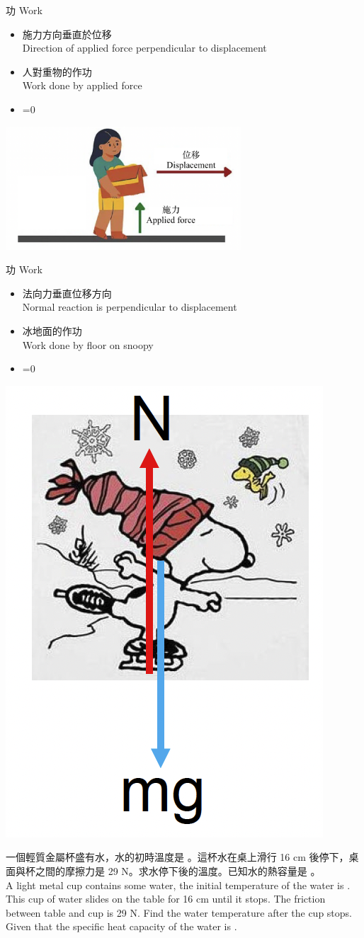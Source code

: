 \documentclass[beamer=true]{standalone}
\begin{document}
\begin{frame}{功 Work}
    \begin{itemize}
        \item 施力方向垂直於位移\\Direction of applied force perpendicular to displacement
        \item[] 人對重物的作功\\Work done by applied force
        \item[] =0
    \end{itemize}
    {\par\centering
    \includegraphics[width=0.66\textwidth]{assets/8303537c.png}
    \par}
\end{frame}

\begin{frame}{功 Work}
    \begin{itemize}
        \item 法向力垂直位移方向\\Normal reaction is perpendicular to displacement
        \item[] 冰地面的作功\\Work done by floor on snoopy
        \item[] =0
    \end{itemize}
    {\par\centering
    \includegraphics[width=.25\textwidth]{assets/330254f1.png}
    \par}
\end{frame}

\begin{eg}
    一個輕質金屬杯盛有水，水的初時溫度是 。這杯水在桌上滑行 16 cm 後停下，桌面與杯之間的摩擦力是 29 N。求水停下後的溫度。已知水的熱容量是 。 \\A light metal cup contains some water, the initial temperature of the water is . This cup of water slides on the table for 16 cm until it stops. The friction between table and cup is 29 N. Find the water temperature after the cup stops. Given that the specific heat capacity of the water is .
\end{eg}
\end{document}
